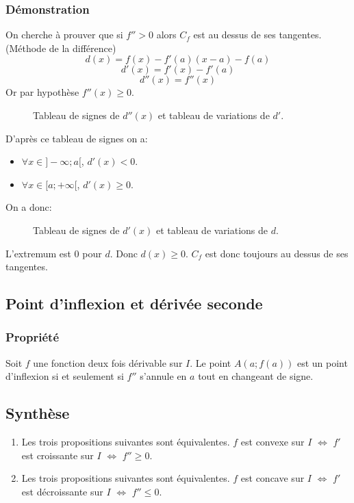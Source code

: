 \documentclass[9pt,twoside]{article}
\begin{document}
\subsubsection*{Démonstration}
On cherche à prouver que si $f''>0$ alors $C_f$ est au dessus de ses tangentes. 
\\(Méthode de la différence)
$$d(x) = f(x) - f'(a)(x-a)-f(a)$$
$$d'(x) = f'(x) - f'(a)$$
$$d''(x) = f''(x)$$
Or par hypothèse $f''(x)\geq 0$.
\begin{figure}[H]
	\centering
	\caption{Tableau de signes de $d''(x)$ et tableau de variations de $d'$.}
\end{figure}
D'après ce tableau de signes on a:
\begin{itemize}[label=\textbullet]
	\item $\forall x \in ]-\infty;a[$, $d'(x)<0$.
	\item $\forall x \in [a;+\infty[$, $d'(x)\geq 0$.
\end{itemize}
On a donc:
\begin{figure}[H]
	\centering
	\caption{Tableau de signes de $d'(x)$ et tableau de variations de $d$.}
\end{figure}
L'extremum est 0 pour $d$. Donc $d(x)\geq 0$.
$C_f$ est donc toujours au dessus de ses tangentes.
\subsection{Point d'inflexion et dérivée seconde}
\subsubsection*{Propriété}
Soit $f$ une fonction deux fois dérivable sur $I$. Le point $A(a;f(a))$ est un point d'inflexion si et seulement si $f''$ s'annule en $a$ tout en changeant de signe.
\subsection{Synthèse}
\begin{enumerate}
	\item Les trois propositions suivantes sont équivalentes. $f$ est convexe sur $I$ $\iff$ $f'$ est croissante sur $I$ $\iff$ $f''\geq 0$.
	\item Les trois propositions suivantes sont équivalentes. $f$ est concave sur $I$ $\iff$ $f'$ est décroissante sur $I$ $\iff$ $f''\leq 0$.
\end{enumerate} \newpage
\end{document}
